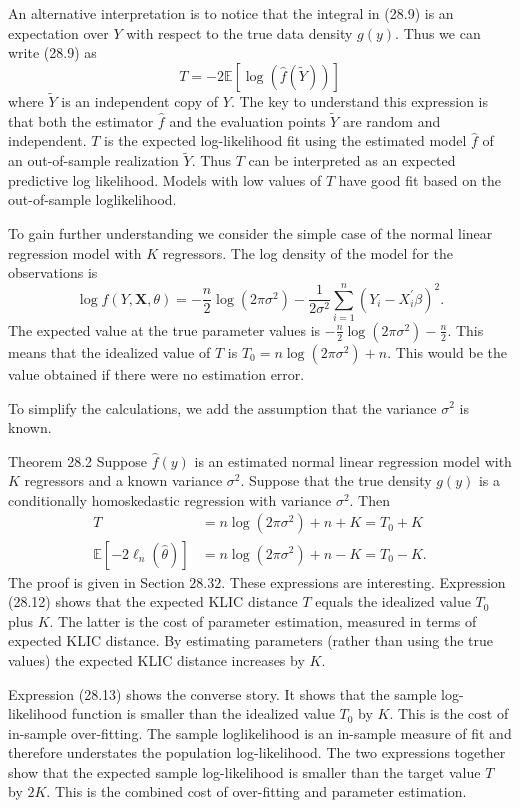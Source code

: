 \documentclass[10pt]{article}
\begin{document}
An alternative interpretation is to notice that the integral in (28.9) is an expectation over $Y$ with respect to the true data density $g(y)$. Thus we can write (28.9) as
$$
T=-2 \mathbb{E}[\log (\widehat{f}(\widetilde{Y}))]
$$
where $\tilde{Y}$ is an independent copy of $Y$. The key to understand this expression is that both the estimator $\widehat{f}$ and the evaluation points $\widetilde{Y}$ are random and independent. $T$ is the expected log-likelihood fit using the estimated model $\widehat{f}$ of an out-of-sample realization $\widetilde{Y}$. Thus $T$ can be interpreted as an expected predictive log likelihood. Models with low values of $T$ have good fit based on the out-of-sample loglikelihood.

To gain further understanding we consider the simple case of the normal linear regression model with $K$ regressors. The log density of the model for the observations is
$$
\log f(Y, \boldsymbol{X}, \theta)=-\frac{n}{2} \log \left(2 \pi \sigma^{2}\right)-\frac{1}{2 \sigma^{2}} \sum_{i=1}^{n}\left(Y_{i}-X_{i}^{\prime} \beta\right)^{2} .
$$
The expected value at the true parameter values is $-\frac{n}{2} \log \left(2 \pi \sigma^{2}\right)-\frac{n}{2}$. This means that the idealized value of $T$ is $T_{0}=n \log \left(2 \pi \sigma^{2}\right)+n$. This would be the value obtained if there were no estimation error.

To simplify the calculations, we add the assumption that the variance $\sigma^{2}$ is known.

Theorem 28.2 Suppose $\widehat{f}(y)$ is an estimated normal linear regression model with $K$ regressors and a known variance $\sigma^{2}$. Suppose that the true density $g(y)$ is a conditionally homoskedastic regression with variance $\sigma^{2}$. Then
$$
\begin{aligned}
T &=n \log \left(2 \pi \sigma^{2}\right)+n+K=T_{0}+K \\
\mathbb{E}\left[-2 \ell_{n}(\widehat{\theta})\right] &=n \log \left(2 \pi \sigma^{2}\right)+n-K=T_{0}-K .
\end{aligned}
$$
The proof is given in Section $28.32$. These expressions are interesting. Expression (28.12) shows that the expected KLIC distance $T$ equals the idealized value $T_{0}$ plus $K$. The latter is the cost of parameter estimation, measured in terms of expected KLIC distance. By estimating parameters (rather than using the true values) the expected KLIC distance increases by $K$.

Expression (28.13) shows the converse story. It shows that the sample log-likelihood function is smaller than the idealized value $T_{0}$ by $K$. This is the cost of in-sample over-fitting. The sample loglikelihood is an in-sample measure of fit and therefore understates the population log-likelihood. The two expressions together show that the expected sample log-likelihood is smaller than the target value $T$ by $2 K$. This is the combined cost of over-fitting and parameter estimation.
\end{document}
